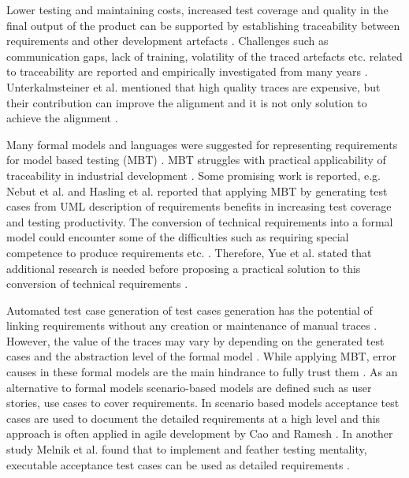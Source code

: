 \documentclass{article}
\begin{document}
Lower testing and maintaining costs, increased test coverage and quality in the final output of the product can be supported by establishing traceability between requirements and other development artefacts \cite{kukkanen2009applying,uusitalo2008linking,watkins1994and}. Challenges such as communication gaps, lack of training, volatility of the traced artefacts etc. related to traceability are reported  and empirically investigated from many years  \cite{bjarnason2014challenges,cleland2003event}. Unterkalmsteiner et al. mentioned that high quality traces are expensive, but their contribution can improve the alignment and it is not only solution to achieve the alignment \cite{unterkalmsteiner2014taxonomy}.

Many formal models and languages were suggested for representing requirements for model based testing (MBT) \cite{dias2007survey}. MBT struggles with practical applicability of traceability in industrial development \cite{nebut2006automatic,yue2011systematic,aichernig2014integration}. Some promising work is reported, e.g. Nebut et al. \cite{nebut2006automatic} and Hasling et al. \cite{hasling2008model} reported that applying MBT by generating test cases from UML description of requirements benefits in increasing test coverage and testing productivity. The conversion of technical requirements into a formal model could encounter some of the difficulties such as requiring special competence to produce requirements etc. \cite{nebut2006automatic}. Therefore, Yue et al. stated that additional research is needed before proposing a practical solution to this conversion of technical requirements \cite{yue2011systematic}. 

Automated test case generation of test cases generation has the potential of linking requirements without any creation or maintenance  of manual traces  \cite{bjarnason2014challenges}. However, the value of the traces may vary by depending on the generated test cases and the abstraction level of the formal model  \cite{sabaliauskaite2010challenges}. While applying MBT, error causes in these formal models are the main hindrance to fully trust them \cite{hasling2008model,ferguson2006empirical}. As an alternative to formal models scenario-based models are defined such as user stories, use cases \cite{regnell2000towards,regnell1998combining}  to cover requirements. In scenario based models acceptance test cases are used to document the detailed requirements at a high level and this approach is often applied in agile development by Cao and Ramesh \cite{cao2008agile}. In  another study Melnik et al. found that to implement and feather testing mentality, executable acceptance test cases can be used as detailed requirements \cite{melnik2006executable}.
\end{document}
